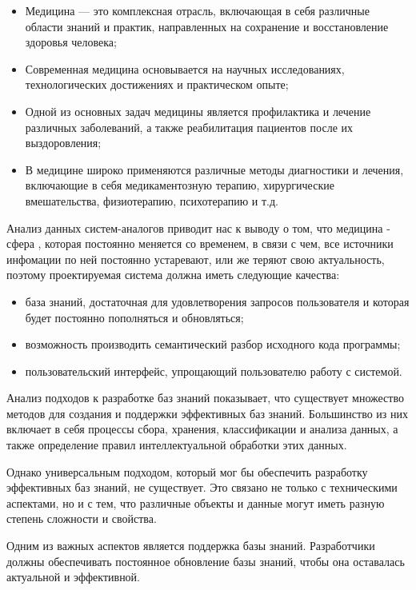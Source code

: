 \begin{itemize}
	\item Медицина — это комплексная отрасль, включающая в себя различные области знаний и практик, направленных на сохранение и восстановление здоровья человека;
	
	\item Современная медицина основывается на научных исследованиях, технологических достижениях и практическом опыте;
	
	\item Одной из основных задач медицины является профилактика и лечение различных заболеваний, а также реабилитация пациентов после их выздоровления;
	
	\item В медицине широко применяются различные методы диагностики и лечения, включающие в себя медикаментозную терапию, хирургические вмешательства, физиотерапию, психотерапию и т.д.
\end{itemize}{}
Анализ данных систем-аналогов приводит нас к выводу о том, что медицина - сфера , которая постоянно меняется со временем, в связи с чем, все источники инфомации по ней постоянно устаревают, или же теряют свою актуальность, поэтому проектируемая система должна иметь следующие качества:
\begin{itemize}
	\item {база знаний, достаточная для удовлетворения запросов пользователя и которая будет постоянно пополняться и обновляться;}
	
	\item{возможность производить семантический разбор исходного кода программы;}
	
	\item{пользовательский интерфейс, упрощающий пользователю работу с системой.}
\end{itemize}
Анализ подходов к разработке баз знаний показывает, что существует множество методов для создания и поддержки эффективных баз знаний. Большинство из них включает в себя процессы сбора, хранения, классификации и анализа данных, а также определение правил интеллектуальной обработки этих данных.

Однако универсальным подходом, который мог бы обеспечить разработку эффективных баз знаний, не существует. Это связано не только с техническими аспектами, но и с тем, что различные объекты и данные могут иметь разную степень сложности и свойства. 

Одним из важных аспектов является поддержка базы знаний. Разработчики должны обеспечивать постоянное обновление базы знаний, чтобы она оставалась актуальной и эффективной. 

